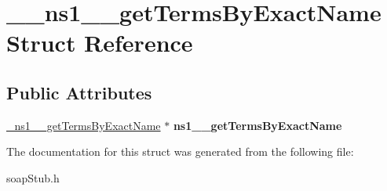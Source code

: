 \hypertarget{struct____ns1____getTermsByExactName}{
\section{\_\-\_\-ns1\_\-\_\-getTermsByExactName Struct Reference}
\label{struct____ns1____getTermsByExactName}
}
\subsection*{Public Attributes}
\begin{DoxyCompactItemize}
\item 
\hypertarget{struct____ns1____getTermsByExactName_aa20c7ddb6f41c082cb04ae0d33ba8954}{
\hyperlink{class__ns1____getTermsByExactName}{\_\-ns1\_\-\_\-getTermsByExactName} $\ast$ {\bfseries ns1\_\-\_\-getTermsByExactName}}
\label{struct____ns1____getTermsByExactName_aa20c7ddb6f41c082cb04ae0d33ba8954}

\end{DoxyCompactItemize}


The documentation for this struct was generated from the following file:\begin{DoxyCompactItemize}
\item 
soapStub.h\end{DoxyCompactItemize}
